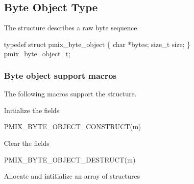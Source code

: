 \subsection{Byte Object Type}

The  structure describes a raw byte sequence.

\cspecificstart
\begin{codepar}
typedef struct pmix_byte_object \{
    char *bytes;
    size_t size;
\} pmix_byte_object_t;
\end{codepar}
\cspecificend

\subsubsection{Byte object support macros}
The following macros support the  structure.


Initialize the  fields

\cspecificstart
\begin{codepar}
PMIX_BYTE_OBJECT_CONSTRUCT(m)
\end{codepar}
\cspecificend

\begin{arglist}
\end{arglist}


Clear the  fields

\cspecificstart
\begin{codepar}
PMIX_BYTE_OBJECT_DESTRUCT(m)
\end{codepar}
\cspecificend

\begin{arglist}
\end{arglist}


Allocate and intitialize an array of  structures

